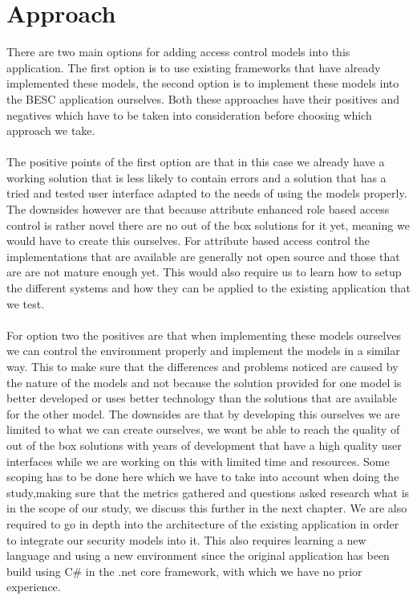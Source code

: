 \section{Approach}
There are two main options for adding access control models into this application.
The first option is to use existing frameworks that have already implemented these models, the second option is to implement these models into the BESC application ourselves.
Both these approaches have their positives and negatives which have to be taken into consideration before choosing which approach we take.
\\
\\
The positive points of the first option are that in this case we already have a working solution that is less likely to contain errors and a solution that has a tried and tested user interface adapted to the needs of using the models properly. 
The downsides however are that because attribute enhanced role based access control is rather novel there are no out of the box solutions for it yet, meaning we would have to create this ourselves.
For attribute based access control the implementations that are available are generally not open source and those that are are not mature enough yet.
This would also require us to learn how to setup the different systems and how they can be applied to the existing application that we test.
\\
\\
For option two the positives are that when implementing these models ourselves we can control the environment properly and implement the models in a similar way.
This to make sure that the differences and problems noticed are caused by the nature of the models and not because the solution provided for one model is better developed or uses better technology than the solutions that are available for the other model.
The downsides are that by developing this ourselves we are limited to what we can create ourselves, we wont be able to reach the quality of out of the box solutions with years of development that have a high quality user interfaces while we are working on this with limited time and resources.
Some scoping has to be done here which we have to take into account when doing the study,making sure that the metrics gathered and questions asked research what is in the scope of our study, we discuss this further in the next chapter. 
We are also required to go in depth into the architecture of the existing application in order to integrate our security models into it.
This also requires learning a new language and using a new environment since the original application has been build using C\# in the .net core framework, with which we have no prior experience.
